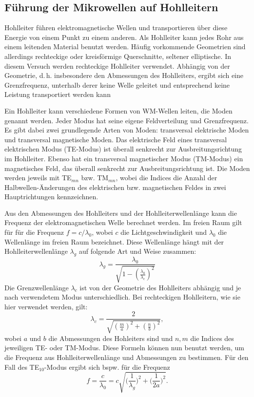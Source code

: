 \subsection{Führung der Mikrowellen auf Hohlleitern}

Hohlleiter führen elektromagnetische Wellen und transportieren über
diese Energie von einem Punkt zu einem anderen.  Als Hohlleiter kann
jedes Rohr aus einem leitenden Material benutzt werden.  Häufig
vorkommende Geometrien sind allerdings rechteckige oder kreisförmige
Querschnitte, seltener elliptische.  In diesem Versuch werden
rechteckige Hohlleiter verwendet.  Abhängig von der Geometrie,
d.\,h. insbesondere den Abmessungen des Hohlleiters, ergibt sich eine
Grenzfrequenz, unterhalb derer keine Welle geleitet und entsprechend
keine Leistung transportiert werden kann 

Ein Hohlleiter kann verschiedene Formen von WM-Wellen leiten, die Moden
genannt werden. Jeder Modus hat seine eigene Feldverteilung und
Grenzfrequenz. Es gibt dabei zwei grundlegende Arten von Moden:
transversal elektrische Moden und transversal magnetische Moden.  Das
elektrische Feld eines transversal elektrischen Modus (TE-Modus) ist
überall senkrecht zur Ausbreitungsrichtung im Hohlleiter.  Ebenso hat
ein transversal magnetischer Modus (TM-Modus) ein magnetisches Feld, das
überall senkrecht zur Ausbreitungsrichtung ist.  Die Moden werden
jeweils mit TE$_{mn}$ bzw. TM$_{mn}$, wobei die Indices die Anzahl der
Halbwellen-Änderungen des elektrischen bzw. magnetischen Feldes in zwei
Hauptrichtungen kennzeichnen.

Aus den Abmessungen des Hohlleiters und der Hohlleiterwellenlänge kann
die Frequenz der elektromagnetischen Welle berechnet werden. Im freien
Raum gilt für für die Frequenz $f = c/\lambda_0$, wobei $c$ die
Lichtgeschwindigkeit und $\lambda_0$ die Wellenlänge im freien Raum
bezeichnet.  Diese Wellenlänge hängt mit der Hohlleiterwellenlänge
$\lambda_g$ auf folgende Art und Weise zusammen:
%
\begin{equation}
  \lambda_g = \frac{\lambda_0}{\sqrt{1 - \left(\frac{\lambda_0}{\lambda_\text{c}}\right)^2}}
\end{equation}
%
Die Grenzwellenlänge $\lambda_c$ ist von der Geometrie des Hohlleiters
abhängig und je nach verwendetem Modus unterschiedlich. Bei rechteckigen
Hohlleitern, wie sie hier verwendet werden, gilt:
\begin{equation}
  \lambda_c = \frac{2}{\sqrt{\left(\frac{m}{a}\right)^2 + \left(\frac{n}{b}\right)^2}},
\end{equation}
%
wobei $a$ und $b$ die Abmessungen des Hohleiters sind und $n, m$ die
Indices des jeweiligen TE- oder TM-Modus.  Diese Formeln können nun
benutzt werden, um die Frequenz aus Hohlleiterwellenlänge und
Abmessungen zu bestimmen. Für den Fall des TE$_{10}$-Modus ergibt sich
bspw. für die Frequenz
%
\begin{equation}
  \label{eq:freq-hohl}
  f = \frac{c}{\lambda_0} = c \sqrt{\Big(\frac{1}{\lambda_g}\Big)^2 + \Big(\frac{1}{2a}\Big)^2}.
\end{equation}

